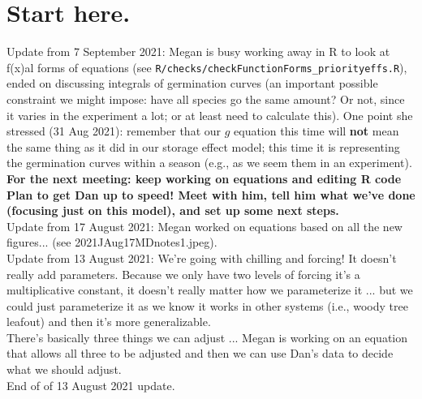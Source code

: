 \documentclass[11pt,letter]{article}
\begin{document}
\section{Start here.} 


Update from 7 September 2021: Megan is busy working away in R to look at f(x)al forms of equations (see \verb|R/checks/checkFunctionForms_priorityeffs.R|), ended on discussing integrals of germination curves (an important possible constraint we might impose: have all species go the same amount? Or not, since it varies in the experiment a lot; or at least need to calculate this). One point she stressed (31 Aug 2021): remember that our $g$ equation this time will {\bf not} mean the same thing as it did in our storage effect model; this time it is representing the germination curves within a season (e.g., as we seem them in an experiment). {\bf For the next meeting: keep working on equations and editing R code}\\

 {\bf Plan to get Dan up to speed! Meet with him, tell him what we've done (focusing just on this model), and set up some next steps. } \\

Update from 17 August 2021: Megan worked on equations based on all the new figures... (see 2021JAug17MDnotes1.jpeg).\\

Update from 13 August 2021: We're going with chilling and forcing! It doesn't really add parameters. Because we only have two levels of forcing it's a multiplicative constant, it doesn't really matter how we parameterize it ... but we could just parameterize it as we know it works in other systems (i.e., woody tree leafout) and then it's more generalizable. \\

There's basically three things we can adjust ... Megan is working on an equation that allows all three to be adjusted and then we can use Dan's data to decide what we should adjust.\\

End of of 13 August 2021 update.\\
\end{document}
